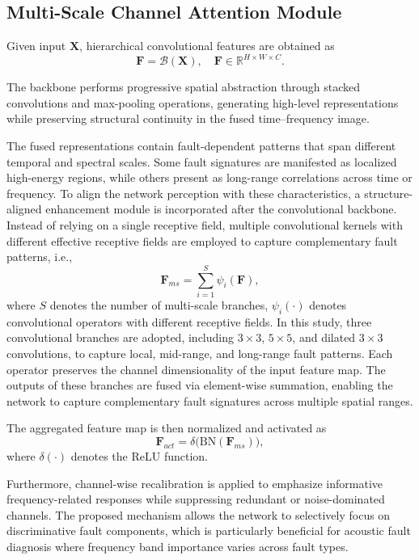 \documentclass[journal]{IEEEtran}
\begin{document}
\subsection{Multi-Scale Channel Attention Module}
Given input $\boldsymbol{X}$, hierarchical convolutional features are obtained as
\begin{equation}
	\boldsymbol{F} = \mathcal{B}(\boldsymbol{X}), \quad \boldsymbol{F} \in \mathbb{R}^{H \times W \times C}.
	\label{eq:feature_map}
\end{equation}

The backbone performs progressive spatial abstraction through stacked convolutions and max-pooling operations, generating high-level representations while preserving structural continuity in the fused time–frequency image.

The fused representations contain fault-dependent patterns that span different temporal and spectral scales. Some fault signatures are manifested as localized high-energy regions, while others present as long-range correlations across time or frequency. To align the network perception with these characteristics, a structure-aligned enhancement module is incorporated after the convolutional backbone. Instead of relying on a single receptive field, multiple convolutional kernels with different effective receptive fields are employed to capture complementary fault patterns, i.e.,
\begin{equation}
	\boldsymbol{F}_{ms} = \sum_{i=1}^{S} \psi_i(\boldsymbol{F}),
	\label{eq:multi_scale_feature}
\end{equation}
where $S$ denotes the number of multi-scale branches, $\psi_i(\cdot)$ denotes convolutional operators with different receptive fields. In this study, three convolutional branches are adopted, including $3\times3$, $5\times5$, and dilated $3\times3$ convolutions, to capture local, mid-range, and long-range fault patterns. Each operator preserves the channel dimensionality of the input feature map. The outputs of these branches are fused via element-wise summation, enabling the network to capture complementary fault signatures across multiple spatial ranges.

The aggregated feature map is then normalized and activated as
\begin{equation}
	\boldsymbol{F}_{act} = \delta\big(\text{BN}(\boldsymbol{F}_{ms})\big),
	\label{eq:active_feature}
\end{equation}
where $\delta(\cdot)$ denotes the ReLU function.

Furthermore, channel-wise recalibration is applied to emphasize informative frequency-related responses while suppressing redundant or noise-dominated channels. The proposed mechanism allows the network to selectively focus on discriminative fault components, which is particularly beneficial for acoustic fault diagnosis where frequency band importance varies across fault types. 
\end{document}

